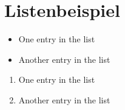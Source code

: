 \section{Listenbeispiel}
    \begin{itemize}
        \item One entry in the list
        \item Another entry in the list
    \end{itemize}
    \begin{enumerate}
        \item One entry in the list
        \item Another entry in the list
    \end{enumerate}